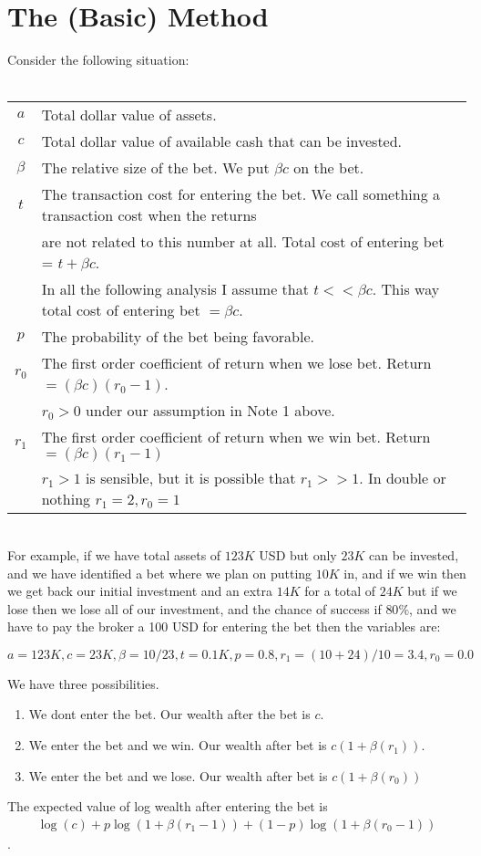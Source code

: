 \documentclass{article}
\begin{document}
\section{The (Basic) Method}
Consider the following situation:~\\
~\\\begin{tabular}{c|l}
    $a$ & Total dollar value of assets.\\
    $c$ & Total dollar value of available cash that can be invested.\\
    $\beta$ & The relative size of the bet. We put $\beta c$ on the bet. \\
    $t$ & The transaction cost for entering the bet. We call something a transaction cost when the returns\\
    & are not related to this number at all. Total cost of entering bet = $t + \beta c$.   \\
    & In all the following analysis I assume that $t << \beta c$. This way total cost of entering bet $ = \beta c$.\\
    $p$ & The probability of the bet being favorable.\\
    $r_0$ & The first order coefficient of return when we lose bet. Return $= (\beta c) (r_0 -1 )$.\\ 
    & $r_0 > 0$ under our assumption in Note 1 above. \\
    $r_1$ & The first order coefficient of return when we win bet. Return $= (\beta c) (r_1 -1)$\\
    & $r_1 > 1$ is sensible, but it is possible that $r_1 >> 1$. In double or nothing $r_1 = 2, r_0 = 1$
\end{tabular}~\\

For example, if we have total assets of $123K$ USD but only $23K$ can be invested, and we have identified a bet where we plan on putting $10K$ in, and if we win then we get back our initial investment and an extra $14K$ for a total of $24K$ but if we lose then we lose all of our investment, and the chance of success if $80\%$, and we have to pay the broker a 100 USD for entering the bet then the variables are:

$a=123K, c=23K, \beta=10/23, t=0.1K,  p=0.8, r_1 = (10 + 24)/10 = 3.4, r_0 = 0.0$

We have three possibilities.
\begin{enumerate}
    \item We dont enter the bet. Our wealth after the bet is $c$.
    \item We enter the bet and we win. Our wealth after bet is $c (1 + \beta(r_1 ))$.
    \item We enter the bet and we lose. Our wealth after bet is $c (1 + \beta (r_0))$
\end{enumerate}
The expected value of log wealth after entering the bet is
\begin{align}
    \log(c) + p \log(1 + \beta (r_1 -1)) + (1-p) \log(1 + \beta (r_0 - 1))
\end{align}. 
\end{document}
